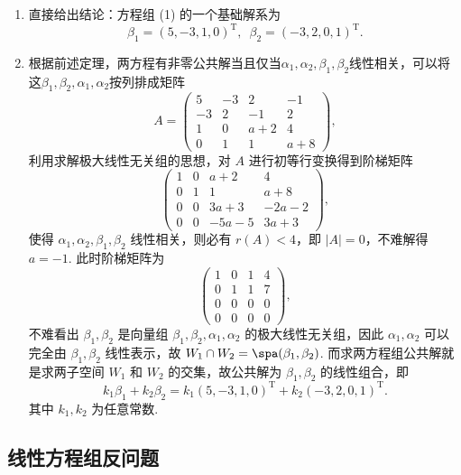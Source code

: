 \begin{solution}
    \begin{enumerate}
        \item 直接给出结论：方程组 (1) 的一个基础解系为
              \[\beta_1=(5,-3,1,0)^{\mathrm{T}},\enspace\beta_2=(-3,2,0,1)^{\mathrm{T}}.\]

        \item 根据前述定理，两方程有非零公共解当且仅当$\alpha_1,\alpha_2,\beta_1,\beta_2$线性相关，可以将这$\beta_1,\beta_2,\alpha_1,\alpha_2$按列排成矩阵
              \[A = \begin{pmatrix}
                      5 & -3 & 2 & -1 \\ -3 & 2 & -1 & 2 \\ 1 & 0 & a+2 & 4 \\ 0 & 1 & 1 & a+8
                  \end{pmatrix},\]
              利用求解极大线性无关组的思想，对 $A$ 进行初等行变换得到阶梯矩阵
              \[\begin{pmatrix}
                      1 & 0 & a+2 & 4 \\ 0 & 1 & 1 & a+8 \\ 0 & 0 & 3a+3 & -2a-2 \\ 0 & 0 & -5a-5 & 3a+3
                  \end{pmatrix},\]
              使得 $\alpha_1,\alpha_2,\beta_1,\beta_2$ 线性相关，则必有 $r(A) < 4$，即 $|A| = 0$，不难解得 $a = -1$. 此时阶梯矩阵为
              \[\begin{pmatrix}
                      1 & 0 & 1 & 4 \\ 0 & 1 & 1 & 7 \\ 0 & 0 & 0 & 0 \\ 0 & 0 & 0 & 0
                  \end{pmatrix},\]
              不难看出 $\beta_1,\beta_2$ 是向量组 $\beta_1,\beta_2,\alpha_1,\alpha_2$ 的极大线性无关组，因此 $\alpha_1,\alpha_2$ 可以完全由 $\beta_1,\beta_2$ 线性表示，故 $W_1 \cap W_2 = \spa(\beta_1,\beta_2)$. 而求两方程组公共解就是求两子空间 $W_1$ 和 $W_2$ 的交集，故公共解为 $\beta_1,\beta_2$ 的线性组合，即
              \[k_1\beta_1 + k_2\beta_2 = k_1(5,-3,1,0)^{\mathrm{T}} + k_2(-3,2,0,1)^{\mathrm{T}}.\]
              其中 $k_1,k_2$ 为任意常数.
    \end{enumerate}
\end{solution}

\subsection{线性方程组反问题}

